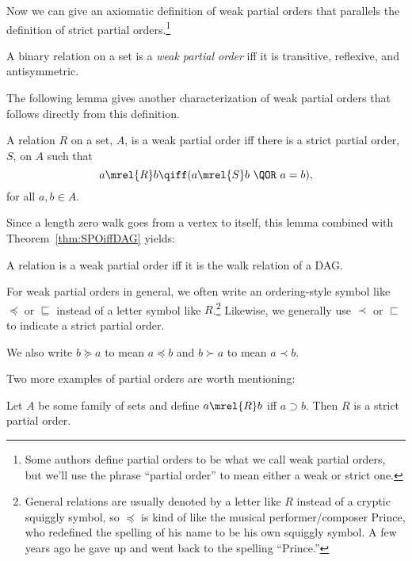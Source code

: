 Now we can give an axiomatic definition of weak partial orders that
parallels the definition of strict partial orders.\footnote{Some
  authors define partial orders to be what we call weak partial
  orders, but we'll use the phrase ``partial order'' to mean either a
  weak or strict one.}

\begin{definition}\label{def:weakPO-axiom}
A binary relation on a set is a \emph{weak partial order} iff it is
transitive, reflexive, and antisymmetric.
\end{definition}

The following lemma gives another characterization of weak partial
orders that follows directly from this definition.
\begin{lemma}
A relation $R$ on a set, $A$, is a weak partial order iff
there is a strict partial order, $S$, on $A$ such that
\[
a \mrel{R} b \qiff (a \mrel{S} b\ \QOR\ a = b),
\]
for all $a,b \in A$.
\end{lemma}

Since a length zero walk goes from a vertex to itself, this lemma
combined with Theorem~\ref{thm:SPOiffDAG} yields:
\begin{corollary}\label{weakPOiffDAGwalk}
A relation is a weak partial order iff it is the walk relation of a DAG.
\end{corollary}

For weak partial orders in general, we often write an ordering-style
symbol like $\preceq$ or $\sqsubseteq$ instead of a letter symbol like
$R$.\footnote{General relations are usually denoted by a letter like
  $R$ instead of a cryptic squiggly symbol, so $\preceq$ is kind of
  like the musical performer/composer Prince, who redefined the
  spelling of his name to be his own squiggly symbol.  A few years ago
  he gave up and went back to the spelling ``Prince.''}  Likewise, we
generally use $\prec$ or $\sqsubset$ to indicate a strict partial
order.

\begin{editingnotes}

We also write $b \succeq a$ to
mean $a \preceq b$ and $b \succ a$ to mean $a \prec b$.

\end{editingnotes}

Two more examples of partial orders are worth mentioning:

\begin{example}\label{supset}
Let $A$ be some family of sets and define $a \mrel{R} b$ iff $a
\supset b$.  Then $R$ is a strict partial order.
\end{example}

